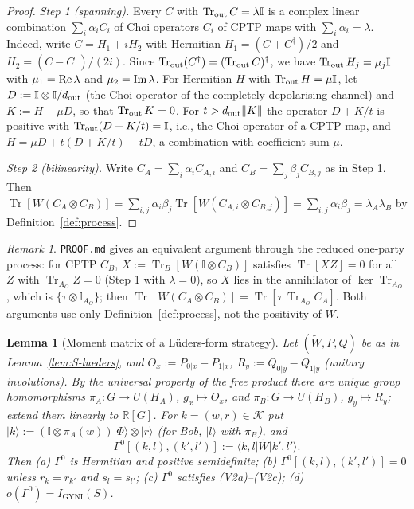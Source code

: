\documentclass[aps,pra,onecolumn,notitlepage,superscriptaddress,longbibliography,nofootinbib,11pt]{revtex4-2}
\newtheorem{lemma}{Lemma}
\theoremstyle{remark}
\newtheorem{remark}{Remark}
\newcommand{\Tr}{\operatorname{Tr}}
\newcommand{\ket}[1]{\lvert #1\rangle}
\newcommand{\bra}[1]{\langle #1\rvert}
\newcommand{\one}{\mathbb{I}}
\newcommand{\RR}{\mathbb{R}}
\newcommand{\Igy}{I_{\mathrm{GYNI}}}
\newcommand{\cK}{\mathcal{K}}
\newcommand{\file}[1]{\texttt{#1}}
\begin{document}
\begin{proof}
\emph{Step 1 (spanning).} Every $C$ with $\Tr_{\rm out}C=\lambda\one$ is a complex linear combination $\sum_i\alpha_iC_i$ of Choi operators $C_i$ of CPTP maps with $\sum_i\alpha_i=\lambda$. Indeed, write $C=H_1+iH_2$ with Hermitian $H_1=(C+C^\dagger)/2$ and $H_2=(C-C^\dagger)/(2i)$. Since $\Tr_{\rm out}(C^\dagger)=(\Tr_{\rm out}C)^\dagger$, we have $\Tr_{\rm out}H_j=\mu_j\one$ with $\mu_1={\rm Re}\,\lambda$ and $\mu_2={\rm Im}\,\lambda$. For Hermitian $H$ with $\Tr_{\rm out}H=\mu\one$, let $D:=\one\otimes\one/d_{\rm out}$ (the Choi operator of the completely depolarising channel) and $K:=H-\mu D$, so that $\Tr_{\rm out}K=0$. For $t>d_{\rm out}\|K\|$ the operator $D+K/t$ is positive with $\Tr_{\rm out}(D+K/t)=\one$, i.e., the Choi operator of a CPTP map, and $H=\mu D+t(D+K/t)-tD$, a combination with coefficient sum $\mu$.

\emph{Step 2 (bilinearity).} Write $C_A=\sum_i\alpha_iC_{A,i}$ and $C_B=\sum_j\beta_jC_{B,j}$ as in Step 1. Then $\Tr[W(C_A\otimes C_B)]=\sum_{i,j}\alpha_i\beta_j\Tr[W(C_{A,i}\otimes C_{B,j})]=\sum_{i,j}\alpha_i\beta_j=\lambda_A\lambda_B$ by Definition~\ref{def:process}.
\end{proof}

\begin{remark}
\file{PROOF.md} gives an equivalent argument through the reduced one-party process: for CPTP $C_B$, $X:=\Tr_B[W(\one\otimes C_B)]$ satisfies $\Tr[XZ]=0$ for all $Z$ with $\Tr_{A_O}Z=0$ (Step 1 with $\lambda=0$), so $X$ lies in the annihilator of $\ker\Tr_{A_O}$, which is $\{\tau\otimes\one_{A_O}\}$; then $\Tr[W(C_A\otimes C_B)]=\Tr[\tau\,\Tr_{A_O}C_A]$. Both arguments use only Definition~\ref{def:process}, not the positivity of $W$.
\end{remark}

\begin{lemma}[Moment matrix of a L\"uders-form strategy]\label{lem:S-moment}
Let $(\widetilde W,P,Q)$ be as in Lemma~\ref{lem:S-lueders}, and $O_x:=P_{0|x}-P_{1|x}$, $R_y:=Q_{0|y}-Q_{1|y}$ (unitary involutions). By the universal property of the free product there are unique group homomorphisms $\pi_A:G\to U(H_A)$, $g_x\mapsto O_x$, and $\pi_B:G\to U(H_B)$, $g_y\mapsto R_y$; extend them linearly to $\RR[G]$. For $k=(w,r)\in\cK$ put $\ket{k}:=(\one\otimes\pi_A(w))\ket{\Phi}\otimes\ket{r}$ (for Bob, $\ket{l}$ with $\pi_B$), and
\begin{equation}
\Gamma^0[(k,l),(k',l')]:=\bra{k,l}\widetilde W\ket{k',l'} .
\end{equation}
Then (a) $\Gamma^0$ is Hermitian and positive semidefinite; (b) $\Gamma^0[(k,l),(k',l')]=0$ unless $r_k=r_{k'}$ and $s_l=s_{l'}$; (c) $\Gamma^0$ satisfies (V2a)--(V2c); (d) $o(\Gamma^0)=\Igy(S)$.
\end{lemma}
\end{document}
